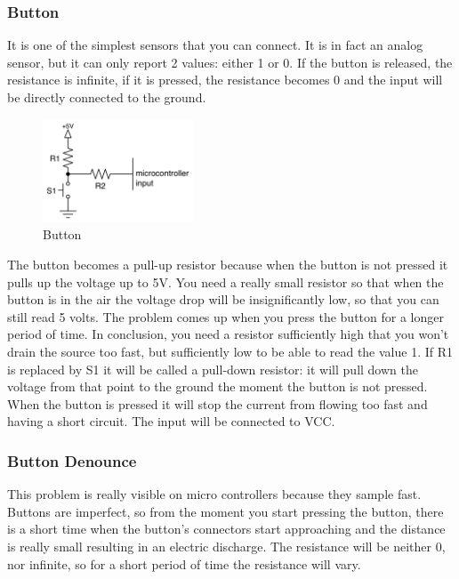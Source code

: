 \subsubsection{Button}
It is one of the simplest sensors that you can connect. It is in fact an analog sensor, but it can only report 2 values: either 1 or 0. If the button is released, the resistance is infinite, if it is pressed, the resistance becomes 0 and the input will be directly connected to the ground. 

\begin{figure}[ht]
    \centering
    \includegraphics[width=0.4\textwidth]{figures/Button.png}
    \caption{Button}
\end{figure}

The button becomes a pull-up resistor because when the button is not pressed it pulls up the voltage up to 5V. You need a really small resistor so that when the button is in the air the voltage drop will be insignificantly low, so that you can still read 5 volts. The problem comes up when you press the button for a longer period of time. In conclusion, you need a resistor sufficiently high that you won’t drain the source too fast, but sufficiently low to be able to read the value 1.  
If R1 is replaced by S1 it will be called a pull-down resistor: it will pull down the voltage from that point to the ground the moment the button is not pressed. When the button is pressed it will stop the current from flowing too fast and having a short circuit. The input will be connected to VCC.  

\subsubsection{Button Denounce}
This problem is really visible on micro controllers because they sample fast. Buttons are imperfect, so from the moment you start pressing the button, there is a short time when the button’s connectors start approaching and the distance is really small resulting in an electric discharge. The resistance will be neither 0, nor infinite, so for a short period of time the resistance will vary.

